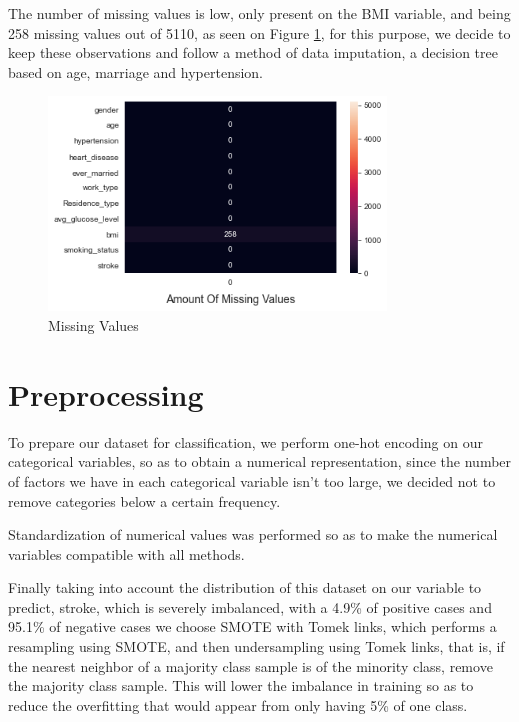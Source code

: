 \documentclass[11pt, a4paper]{article}
\begin{document}
The number of missing values is low, only present on the BMI variable, and being 258 missing values out of 5110, as seen on Figure \ref{fig:missingValues}, for this purpose, we decide to keep these observations and follow a method of data imputation, a decision tree based on age, marriage and hypertension.

\begin{figure}[H]
    \centering
    \includegraphics[width=0.8\textwidth]{images/MissingValues.png}
    \caption{Missing Values}
    \label{fig:missingValues}
\end{figure}


\section{Preprocessing}


To prepare our dataset for classification, we perform one-hot encoding on our categorical variables, so as to obtain a numerical representation, since the number of factors we have in each categorical variable isn't too large, we decided not to remove categories below a certain frequency.

Standardization of numerical values was performed so as to make the numerical variables compatible with all methods.


Finally taking into account the distribution of this dataset on our variable to predict, stroke, which is severely imbalanced, with a 4.9\% of positive cases and 95.1\% of negative cases we choose SMOTE with Tomek links, which performs a resampling using SMOTE, and then undersampling using Tomek links, that is, if the nearest neighbor of a majority class sample is of the minority class, remove the majority class sample. This will lower the imbalance in training so as to reduce the overfitting that would appear from only having 5\% of one class.
\end{document}
